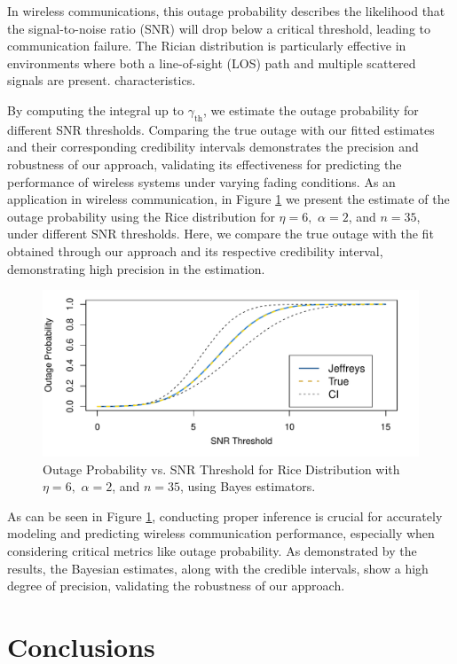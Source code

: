 \documentclass[12pt]{interact}
\theoremstyle{plain}%
\theoremstyle{definition}
\theoremstyle{remark}
\begin{document}
In wireless communications, this outage probability describes the likelihood that the signal-to-noise ratio (SNR) will drop below a critical threshold, leading to communication failure. The Rician distribution is particularly effective in environments where both a line-of-sight (LOS) path and multiple scattered signals are present. characteristics.

By computing the integral up to \( \gamma_{\text{th}} \), we estimate the outage probability for different SNR thresholds. Comparing the true outage with our fitted estimates and their corresponding credibility intervals demonstrates the precision and robustness of our approach, validating its effectiveness for predicting the performance of wireless systems under varying fading conditions.
As an application in wireless communication, in Figure \ref{graf3} we present the estimate of the outage probability using the Rice distribution for $\eta = 6,$ $\alpha = 2$, and $n = 35$, under different SNR thresholds. Here, we compare the true outage with the fit obtained through our approach and its respective credibility interval, demonstrating high precision in the estimation.
\begin{figure}[!h]
\centering
\includegraphics[scale=0.5]{outrage.pdf}
\caption{Outage Probability vs. SNR Threshold for Rice Distribution with $\eta = 6,$ $\alpha = 2$, and $n = 35$, using Bayes estimators.}
\label{graf3}
\end{figure}

As can be seen in  Figure \ref{graf3}, conducting proper inference is crucial for accurately modeling and predicting wireless communication performance, especially when considering critical metrics like outage probability. As demonstrated by the results, the Bayesian estimates, along with the credible intervals, show a high degree of precision, validating the robustness of our approach.

\section{Conclusions}
\end{document}
